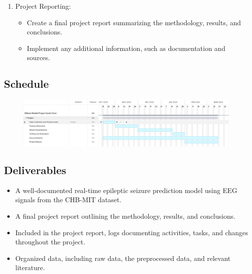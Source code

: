 \documentclass[12pt]{article}
\begin{document}
\begin{enumerate}
    \item Project Reporting:
    \begin{itemize}
        \item Create a final project report summarizing the methodology, results, and conclusions.
        \item Implement any additional information, such as documentation and sources.
    \end{itemize}
\end{enumerate}


\subsection{Schedule}

\begin{figure}[H]
\includegraphics[width=\textwidth]{gantt}
\centering
\end{figure}


\subsection{Deliverables}

\begin{itemize}
    \item A well-documented real-time epileptic seizure prediction model using EEG signals from the CHB-MIT dataset.
    \item A final project report outlining the methodology, results, and conclusions.
    \item Included in the project report, logs documenting activities, tasks, and changes throughout the project.
    \item Organized data, including raw data, the preprocessed data, and relevant literature.
\end{itemize}



\pagebreak

\printglossary[type=\acronymtype]
\printglossary

\pagebreak



\end{document}
